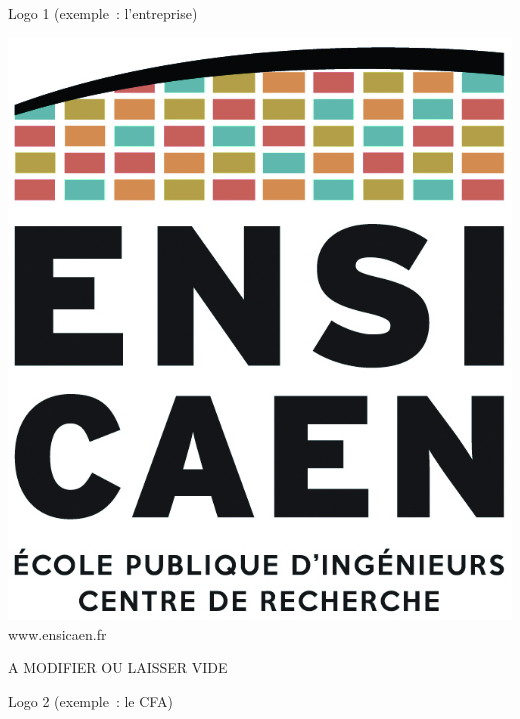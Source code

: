 \documentclass[a4paper]{book}
\begin{document}
\begin{titlepage}
\begin{minipage}[c]{0.33\linewidth}
    Logo 1 (exemple~: l'entreprise)
  \end{minipage}%
  \begin{minipage}[c]{0.33\linewidth}
    \center\includegraphics[width=0.8\linewidth]{logos/LogoEnsicaen2017_crop.png}\\[1em]
    {\color{ensigray}\huge www.ensicaen.fr}
  \end{minipage}%
  \begin{minipage}[c]{0.33\linewidth}
    \center
    {\color{red} A MODIFIER OU LAISSER VIDE}
    
    Logo 2 (exemple~: le CFA)
  \end{minipage}



\end{titlepage}
\restoregeometry
{}
\setlength{\footskip}{2cm}
\end{document}
